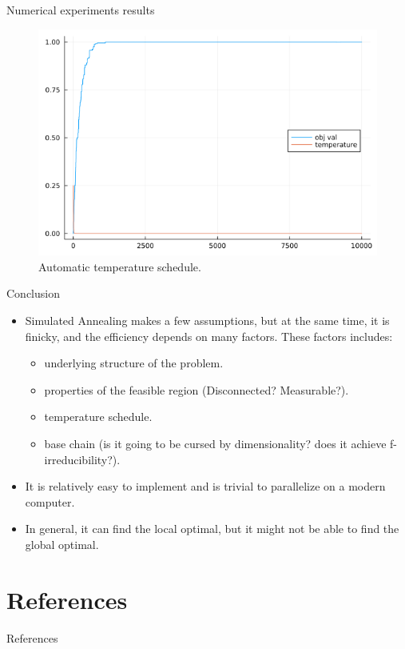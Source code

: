 \documentclass[11pt]{beamer}
\begin{document}
    \begin{frame}{Numerical experiments results}
        \begin{figure}
            \centering
            \includegraphics[scale=0.4]{sa_experiment3.png}
            \caption{Automatic temperature schedule. }
        \end{figure}
    \end{frame}
    \begin{frame}{Conclusion}
        \begin{itemize}
            \item Simulated Annealing makes a few assumptions, but at the same time, it is finicky, and the efficiency depends on many factors. These factors includes: 
                \begin{itemize}
                    \item underlying structure of the problem. 
                    \item properties of the feasible region (Disconnected? Measurable?).
                    \item temperature schedule. 
                    \item base chain (is it going to be cursed by dimensionality? does it achieve f-irreducibility?). 
                \end{itemize}
            \item It is relatively easy to implement and is trivial to parallelize on a modern computer. 
            \item In general, it can find the local optimal, but it might not be able to find the global optimal. 
        \end{itemize}
    \end{frame}

\section{References}
    \begin{frame}{References}
        
    \end{frame}
\end{document}
